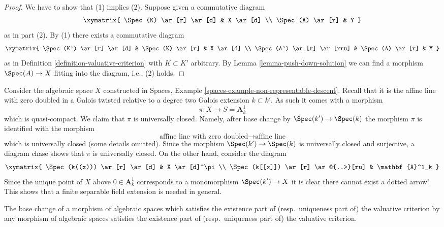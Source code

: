 \begin{proof}
We have to show that (1) implies (2). Suppose given a commutative diagram
$$
\xymatrix{
\Spec(K) \ar[r] \ar[d] & X \ar[d] \\
\Spec(A) \ar[r] & Y
}
$$
as in part (2). By (1) there exists a commutative diagram
$$
\xymatrix{
\Spec(K') \ar[r] \ar[d] & \Spec(K) \ar[r] & X \ar[d] \\
\Spec(A') \ar[r] \ar[rru] & \Spec(A) \ar[r] & Y
}
$$
as in Definition \ref{definition-valuative-criterion} with $K \subset K'$
arbitrary. By Lemma \ref{lemma-push-down-solution} we can find a morphism
$\Spec(A) \to X$ fitting into the diagram, i.e., (2) holds.
\end{proof}

\begin{example}
\label{example-finite-separable-needed}
Consider the algebraic space $X$ constructed in
Spaces, Example \ref{spaces-example-non-representable-descent}.
Recall that it is the affine line with zero doubled in a Galois twisted
relative to a degree two Galois extension $k \subset k'$.
As such it comes with a morphism
$$
\pi : X \longrightarrow S = \mathbf{A}^1_k
$$
which is quasi-compact. We claim that $\pi$ is universally closed.
Namely, after base change by $\Spec(k') \to \Spec(k)$
the morphism $\pi$ is identified with the morphism
$$
\text{affine line with zero doubled}
\longrightarrow
\text{affine line}
$$
which is universally closed (some details omitted). Since the morphism
$\Spec(k') \to \Spec(k)$ is universally closed and
surjective, a diagram chase shows that $\pi$ is universally closed.
On the other hand, consider the diagram
$$
\xymatrix{
\Spec(k((x))) \ar[r] \ar[d] & X \ar[d]^\pi \\
\Spec(k[[x]]) \ar[r] \ar@{..>}[ru] & \mathbf{A}^1_k
}
$$
Since the unique point of $X$ above $0 \in \mathbf{A}^1_k$
corresponds to a monomorphism $\Spec(k') \to X$
it is clear there cannot exist a dotted arrow! This shows that
a finite separable field extension is needed in general.
\end{example}

\begin{lemma}
\label{lemma-base-change-valuative-criteria}
The base change of a morphism of algebraic spaces which satisfies the
existence part of (resp.\ uniqueness part of) the valuative criterion
by any morphism of algebraic spaces satisfies the
existence part of (resp.\ uniqueness part of) the valuative criterion.
\end{lemma}

